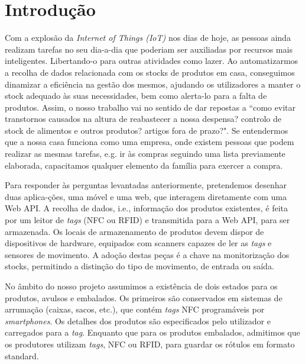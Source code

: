 %
%
\section*{Introdução} \label{Introducao}

Com a explosão da \textit{Internet of Things (IoT)} nos dias de hoje, as pessoas ainda realizam tarefas no seu dia-a-dia que poderiam ser auxiliadas por recursos mais inteligentes. Libertando-o para outras atividades como lazer. Ao automatizarmos a recolha de dados relacionada com os stocks de produtos em casa, conseguimos dinamizar a eficiência na gestão dos mesmos, ajudando os utilizadores a manter o stock adequado às suas necessidades, bem como alerta-lo para a falta de produtos. Assim, o nosso trabalho vai no sentido de dar repostas a ``como evitar transtornos causados na altura de reabastecer a nossa despensa? controlo de stock de alimentos e outros produtos? artigos fora de prazo?". Se entendermos que a nossa casa funciona como uma empresa, onde existem pessoas que podem realizar as mesmas tarefas, e.g. ir às compras seguindo uma lista previamente elaborada, capacitamos qualquer elemento da família para exercer a compra.

Para responder às perguntas levantadas anteriormente, pretendemos desenhar duas aplica-ções, uma móvel e uma web, que interagem diretamente com uma Web API. A recolha de dados, i.e., informação dos produtos existentes, é feita por um leitor de {\itshape tags} (NFC ou RFID) e transmitida para a Web API, para ser armazenada. Os locais de armazenamento de produtos devem dispor de dispositivos de hardware, equipados com scanners capazes de ler as {\itshape tags} e sensores de movimento. A adoção destas peças é a chave na monitorização dos stocks, permitindo a distinção do tipo de movimento, de entrada ou saída.

No âmbito do nosso projeto assumimos a existência de dois estados para os produtos, avulsos e embalados. Os primeiros são conservados em sistemas de arrumação (caixas, sacos, etc.), que contém {\itshape tags} NFC programáveis por {\itshape smartphones}. Os detalhes dos produtos são especificados pelo utilizador e carregados para a {\itshape tag}. Enquanto que para os produtos embalados, admitimos que os produtores utilizam {\itshape tags}, NFC ou RFID, para guardar os rótulos em formato standard.


\vspace{-1mm}
\hspace{-8mm}
